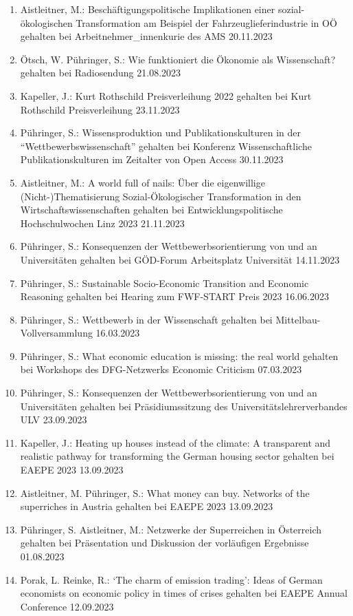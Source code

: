 \begin{enumerate}
	\item Aistleitner, M.: Beschäftigungspolitische Implikationen einer sozial-ökologischen Transformation am Beispiel der Fahrzeuglieferindustrie in OÖ gehalten bei Arbeitnehmer\_innenkurie des AMS 20.11.2023
	\item Ötsch, W. Pühringer, S.: Wie funktioniert die Ökonomie als Wissenschaft? gehalten bei Radiosendung 21.08.2023
	\item Kapeller, J.: Kurt Rothschild Preisverleihung 2022 gehalten bei Kurt Rothschild Preisverleihung 23.11.2023
	\item Pühringer, S.: Wissensproduktion und Publikationskulturen in der “Wettbewerbswissenschaft” gehalten bei Konferenz Wissenschaftliche Publikationskulturen im Zeitalter von Open Access 30.11.2023
	\item Aistleitner, M.: A world full of nails: Über die eigenwillige (Nicht-)Thematisierung Sozial-Ökologischer Transformation in den Wirtschaftswissenschaften gehalten bei Entwicklungspolitische Hochschulwochen Linz 2023 21.11.2023
	\item Pühringer, S.: Konsequenzen der Wettbewerbsorientierung von und an Universitäten gehalten bei GÖD-Forum \glqq Arbeitsplatz Universität\grqq{} 14.11.2023
	\item Pühringer, S.: Sustainable Socio-Economic Transition and Economic Reasoning gehalten bei Hearing zum FWF-START Preis 2023 16.06.2023
	\item Pühringer, S.: Wettbewerb in der Wissenschaft gehalten bei Mittelbau-Vollversammlung 16.03.2023
	\item Pühringer, S.: What economic education is missing: the real world gehalten bei Workshops des DFG-Netzwerks Economic Criticism 07.03.2023
	\item Pühringer, S.: Konsequenzen der Wettbewerbsorientierung von und an Universitäten gehalten bei Präsidiumssitzung des Universitätslehrerverbandes ULV 23.09.2023
	\item Kapeller, J.: Heating up houses instead of the climate: A transparent and realistic pathway for transforming the German housing sector gehalten bei EAEPE 2023 13.09.2023
	\item Aistleitner, M. Pühringer, S.: What money can buy. Networks of the superriches in Austria gehalten bei EAEPE 2023 13.09.2023
	\item Pühringer, S. Aistleitner, M.: Netzwerke der Superreichen in Österreich gehalten bei Präsentation und Diskussion der vorläufigen Ergebnisse 01.08.2023
	\item Porak, L. Reinke, R.: ‘The charm of emission trading’: Ideas of German economists on economic policy in times of crises gehalten bei EAEPE Annual Conference 12.09.2023

\end{enumerate}
